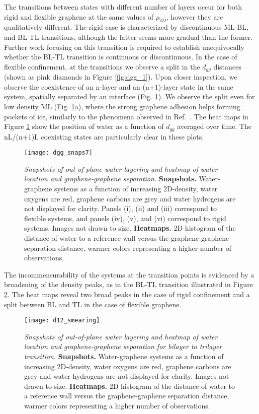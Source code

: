 \documentclass[journal=acsnano,manuscript=article]{achemso}
\begin{document}
	The transitions between states with different number of layers occur for both rigid and flexible graphene at the same values of \(\rho_{2D}\), however they are qualitatively different. The rigid case is characterized by discontinuous ML-BL, and BL-TL transitions, although the latter seems more gradual than the former. Further work focusing on this transition  is required to establish unequivocally whether the BL-TL transition is continuous or discontinuous. In the case of flexible confinement, at the transitions we observe a split in the \(d_{gg}\) distances (shown as pink diamonds in Figure \ref{fig:dgg_1}). Upon closer inspection, we observe the coexistence of an n-layer and an (n+1)-layer state in the same system, spatially separated by an interface (Fig. \ref{fig:dgg_2}). We observe the split even for low density ML (Fig. \ref{fig:dgg_2}a), where the strong graphene adhesion helps forming pockets of ice, similarly to the phenomena observed in Ref.~. The heat maps in Figure \ref{fig:dgg_2} show the position of water as a function of \(d_{gg}\) averaged over time. The nL/(n+1)L coexisting states are particularly clear in these plots.  
	
	\begin{figure}[ht!]
		\centering
		\texttt{[image: dgg\_snaps7]}
		\caption{\textit{Snapshots of out-of-plane water layering and heatmap of water location and graphene-graphene separation.} \textbf{Snapshots.} Water-graphene systems as a function of increasing 2D-density, water oxygens are red, graphene carbons are grey and water hydrogens are not displayed for clarity. Panels (i), (ii) and (iii) correspond to flexible systems, and panels (iv), (v), and (vi) correspond to rigid systems. Images not drawn to size. \textbf{Heatmaps.} 2D histogram of the distance of water to a reference wall versus the graphene-graphene separation distance, warmer colors representing a higher number of observations.}
		\label{fig:dgg_2}
	\end{figure}
	
	The incommensurability of the systems at the transition points is evidenced by a broadening of the density peaks, as in the BL-TL transition illustrated in Figure \ref{fig:dgg_2_to_3}. The heat maps reveal two broad peaks in the case of rigid confinement and a split between BL and TL in the case of flexible graphene.   
	
	\begin{figure}[ht!]
		\centering
		\texttt{[image: d12\_smearing]} %
		\caption{\textit{Snapshots of out-of-plane water layering and heatmap of water location and graphene-graphene separation for bilayer to trilayer transition.} \textbf{Snapshots.} Water-graphene systems as a function of increasing 2D-density, water oxygens are red, graphene carbons are grey and water hydrogens are not displayed for clarity. Images not drawn to size. \textbf{Heatmaps.} 2D histogram of the distance of water to a reference wall versus the graphene-graphene separation distance, warmer colors representing a higher number of observations.}
		\label{fig:dgg_2_to_3}
	\end{figure}
	
\end{document}
